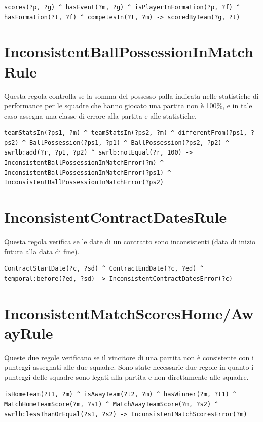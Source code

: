 \documentclass[11pt]{report} %
\begin{document}
\begin{lstlisting}[language=SWRL]
scores(?p, ?g) ^ hasEvent(?m, ?g) ^ isPlayerInFormation(?p, ?f) ^ hasFormation(?t, ?f) ^ competesIn(?t, ?m) -> scoredByTeam(?g, ?t)
\end{lstlisting}

\section{InconsistentBallPossessionInMatchRule}

Questa regola controlla se la somma del possesso palla indicata nelle statistiche di performance per le squadre che hanno giocato una partita non è 100\%, e in tale caso assegna una classe di errore alla partita e alle statistiche.

\begin{lstlisting}[language=SWRL]
teamStatsIn(?ps1, ?m) ^ teamStatsIn(?ps2, ?m) ^ differentFrom(?ps1, ?ps2) ^ BallPossession(?ps1, ?p1) ^ BallPossession(?ps2, ?p2) ^ swrlb:add(?r, ?p1, ?p2) ^ swrlb:notEqual(?r, 100) -> InconsistentBallPossessionInMatchError(?m) ^ InconsistentBallPossessionInMatchError(?ps1) ^ InconsistentBallPossessionInMatchError(?ps2)
\end{lstlisting}

\section{InconsistentContractDatesRule}

Questa regola verifica se le date di un contratto sono inconsistenti (data di inizio futura alla data di fine).

\begin{lstlisting}[language=SWRL]
ContractStartDate(?c, ?sd) ^ ContractEndDate(?c, ?ed) ^ temporal:before(?ed, ?sd) -> InconsistentContractDatesError(?c)
\end{lstlisting}

\section{InconsistentMatchScoresHome/AwayRule}

Queste due regole verificano se il vincitore di una partita non è consistente con i punteggi assegnati alle due squadre.
Sono state necessarie due regole in quanto i punteggi delle squadre sono legati alla partita e non direttamente alle squadre.

\begin{lstlisting}[language=SWRL]
isHomeTeam(?t1, ?m) ^ isAwayTeam(?t2, ?m) ^ hasWinner(?m, ?t1) ^ MatchHomeTeamScore(?m, ?s1) ^ MatchAwayTeamScore(?m, ?s2) ^ swrlb:lessThanOrEqual(?s1, ?s2) -> InconsistentMatchScoresError(?m)
\end{lstlisting}
\end{document}
